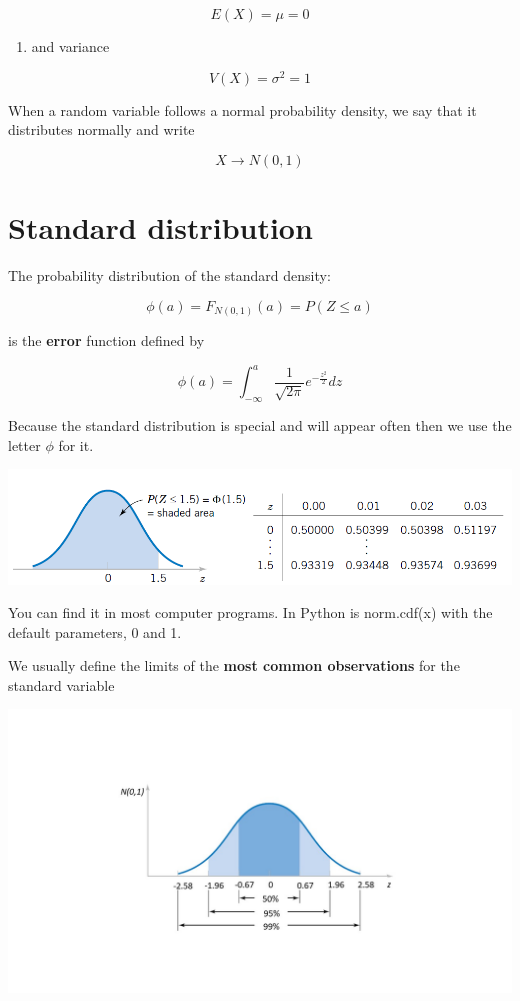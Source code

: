 \documentclass[
]{book}
\providecommand{\tightlist}{%
  \setlength{\itemsep}{0pt}\setlength{\parskip}{0pt}}
\begin{document}
\[E (X)= \mu = 0\]

\begin{enumerate}
\def\labelenumi{\arabic{enumi})}
\setcounter{enumi}{1}
\tightlist
\item
  and variance
\end{enumerate}

\[V (X)=  \sigma^2 =1\]

When a random variable follows a normal probability density, we say that it distributes normally and write

\[X \rightarrow N(0,1)\]

\hypertarget{standard-distribution}{%
\section{Standard distribution}\label{standard-distribution}}

The probability distribution of the standard density:

\[\phi(a)=F_{N(0,1)}(a)=P(Z \leq a)\]

is the \textbf{error} function defined by

\[\phi(a)=\int_{-\infty}^{a} \frac{1}{\sqrt{2\pi}}e^{-\frac{z^2}{2}} dz\]

Because the standard distribution is special and will appear often then we use the letter \(\phi\) for it.

\includegraphics{./figures/st.png}

You can find it in most computer programs. In Python is norm.cdf(x) with the default parameters, 0 and 1.

We usually define the limits of the \textbf{most common observations} for the standard variable

\includegraphics{./figures/phi.JPG}
\end{document}
